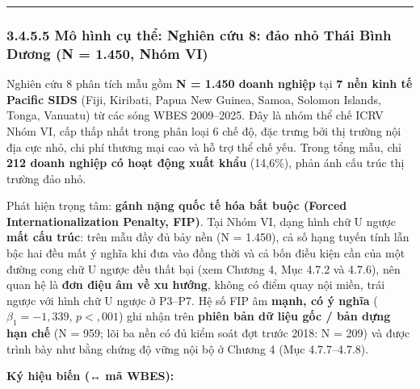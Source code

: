 \documentclass[
  a4paper,
  13pt]{extreport}
\begin{document}
\begin{center}\rule{0.5\linewidth}{0.5pt}\end{center}

\hypertarget{muxf4-huxecnh-cux1ee5-thux1ec3-nghiuxean-cux1ee9u-8-ux111ux1ea3o-nhux1ecf-thuxe1i-buxecnh-dux1b0ux1a1ng-n-1.450-nhuxf3m-vi}{%
\subsubsection{3.4.5.5 Mô hình cụ thể: Nghiên cứu 8: đảo nhỏ Thái Bình
Dương (N = 1.450, Nhóm
VI)}\label{muxf4-huxecnh-cux1ee5-thux1ec3-nghiuxean-cux1ee9u-8-ux111ux1ea3o-nhux1ecf-thuxe1i-buxecnh-dux1b0ux1a1ng-n-1.450-nhuxf3m-vi}}

Nghiên cứu 8 phân tích mẫu gồm \textbf{N = 1.450 doanh nghiệp} tại
\textbf{7 nền kinh tế Pacific SIDS} (Fiji, Kiribati, Papua New Guinea,
Samoa, Solomon Islands, Tonga, Vanuatu) từ các sóng WBES 2009--2025. Đây
là nhóm thể chế ICRV Nhóm VI, cấp thấp nhất trong phân loại 6 chế độ,
đặc trưng bởi thị trường nội địa cực nhỏ, chi phí thương mại cao và hỗ
trợ thể chế yếu. Trong tổng mẫu, chỉ \textbf{212 doanh nghiệp có hoạt
động xuất khẩu} (14,6\%), phản ánh cấu trúc thị trường đảo nhỏ.

Phát hiện trọng tâm: \textbf{gánh nặng quốc tế hóa bắt buộc (Forced
Internationalization Penalty, FIP)}. Tại Nhóm VI, dạng hình chữ U ngược
\textbf{mất cấu trúc}: trên mẫu đầy đủ bảy nền (N = 1.450), cả số hạng
tuyến tính lẫn bậc hai đều mất ý nghĩa khi đưa vào đồng thời và cả bốn
điều kiện cần của một đường cong chữ U ngược đều thất bại (xem Chương 4,
Mục 4.7.2 và 4.7.6), nên quan hệ là \textbf{đơn điệu âm về xu hướng},
không có điểm quay nội miền, trái ngược với hình chữ U ngược ở P3--P7.
Hệ số FIP âm \textbf{mạnh, có ý nghĩa} (\(\beta_1 = -1{,}339\),
\(p < {,}001\)) ghi nhận trên \textbf{phiên bản dữ liệu gốc / bản dựng
hạn chế} (N = 959; lõi ba nền có đủ kiểm soát đợt trước 2018: N = 209)
và được trình bày như bằng chứng độ vững nội bộ ở Chương 4 (Mục
4.7.7--4.7.8).

\textbf{Ký hiệu biến (↔ mã WBES):}
\end{document}
